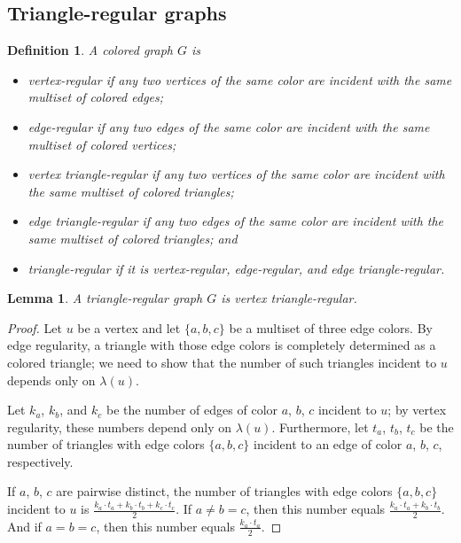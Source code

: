 \documentclass[a4paper, 11pt]{amsart}
\numberwithin{theorem}{section}
\newtheorem{definition}[theorem]{Definition}
\newtheorem{lemma}[theorem]{Lemma}
\begin{document}
\subsection{Triangle-regular graphs}

\begin{definition}
    A colored graph $G$ is 
    \begin{itemize}
        \item \emph{vertex-regular} if any two vertices of the same
	color are incident with the same multiset of colored edges;
        \item \emph{edge-regular} if any two edges of the same color
	are incident with the same multiset of colored vertices;
        \item \emph{vertex triangle-regular} if any two vertices of
	the same color are incident with the same multiset of colored
	triangles;
        \item \emph{edge triangle-regular} if any two edges of the
	same color are incident with the same multiset of colored
	triangles; and 
        \item \emph{triangle-regular} if it is vertex-regular,
	edge-regular, and edge triangle-regular.
    \end{itemize}
\end{definition}

\begin{lemma} \label{lm:Triangle}
    A triangle-regular graph $G$ is vertex triangle-regular.
\end{lemma}
\begin{proof}
    Let $u$ be a vertex and let $\lbrace a,b,c\rbrace$ be a multiset of
    three edge colors.  By edge regularity, a triangle with those edge
    colors is completely determined as a colored triangle; we need to
    show that the number of such triangles incident to $u$ depends
    only on $\lambda(u)$. 
    
    Let $k_a$, $k_b$, and $k_c$ be the number of edges of color $a$,
    $b$, $c$ incident to $u$; by vertex regularity, these numbers
    depend only on $\lambda(u)$. Furthermore, let $t_a$, $t_b$, $t_c$
    be the number of triangles with edge colors $\lbrace a,b,c\rbrace$
    incident to an edge of color $a$, $b$, $c$, respectively.

    If $a$, $b$, $c$ are pairwise distinct, the number of triangles with
    edge colors $\lbrace a,b,c\rbrace$ incident to $u$ is $\frac{k_a\cdot
    t_a+k_b\cdot t_b+k_c\cdot t_c}{2}$. If $a \neq b=c$, then this
    number equals $\frac{k_a\cdot t_a + k_b\cdot
    t_b}{2}$. And if $a=b=c$, then this number equals $\frac{k_a\cdot t_a}{2}$.
\end{proof}
\end{document}

